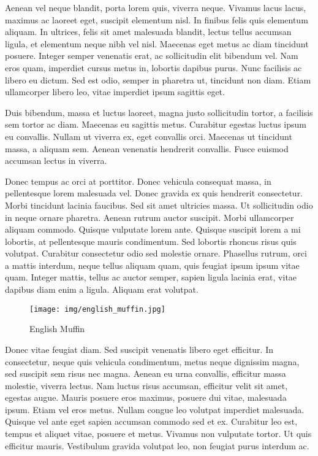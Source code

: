 \documentclass{llncs}
\begin{document}
Aenean vel neque blandit, porta lorem quis, viverra neque. Vivamus lacus lacus, maximus ac laoreet eget, suscipit elementum nisl. In finibus felis quis elementum aliquam. In ultrices, felis sit amet malesuada blandit, lectus tellus accumsan ligula, et elementum neque nibh vel nisl. Maecenas eget metus ac diam tincidunt posuere. Integer semper venenatis erat, ac sollicitudin elit bibendum vel. Nam eros quam, imperdiet cursus metus in, lobortis dapibus purus. Nunc facilisis ac libero eu dictum. Sed est odio, semper in pharetra ut, tincidunt non diam. Etiam ullamcorper libero leo, vitae imperdiet ipsum sagittis eget.

Duis bibendum, massa et luctus laoreet, magna justo sollicitudin tortor, a facilisis sem tortor ac diam. Maecenas eu sagittis metus. Curabitur egestas luctus ipsum eu convallis. Nullam ut viverra ex, eget convallis orci. Maecenas ut tincidunt massa, a aliquam sem. Aenean venenatis hendrerit convallis. Fusce euismod accumsan lectus in viverra.

Donec tempus ac orci at porttitor. Donec vehicula consequat massa, in pellentesque lorem malesuada vel. Donec gravida ex quis hendrerit consectetur. Morbi tincidunt lacinia faucibus. Sed sit amet ultricies massa. Ut sollicitudin odio in neque ornare pharetra. Aenean rutrum auctor suscipit. Morbi ullamcorper aliquam commodo. Quisque vulputate lorem ante. Quisque suscipit lorem a mi lobortis, at pellentesque mauris condimentum. Sed lobortis rhoncus risus quis volutpat. Curabitur consectetur odio sed molestie ornare. Phasellus rutrum, orci a mattis interdum, neque tellus aliquam quam, quis feugiat ipsum ipsum vitae quam. Integer mattis, tellus ac auctor semper, sapien ligula lacinia erat, vitae dapibus diam enim a ligula. Aliquam erat volutpat.

\begin{figure}[h!]
	\begin{center}
	\texttt{[image: img/english\_muffin.jpg]}
	\caption{English Muffin \cite{Muffin:2015}}
	\label{fig:english_muffin}
	\end{center}
\end{figure}

Donec vitae feugiat diam. Sed suscipit venenatis libero eget efficitur. In consectetur, neque quis vehicula condimentum, metus neque dignissim magna, sed suscipit sem risus nec magna. Aenean eu urna convallis, efficitur massa molestie, viverra lectus. Nam luctus risus accumsan, efficitur velit sit amet, egestas augue. Mauris posuere eros maximus, posuere dui vitae, malesuada ipsum. Etiam vel eros metus. Nullam congue leo volutpat imperdiet malesuada. Quisque vel ante eget sapien accumsan commodo sed et ex. Curabitur leo est, tempus et aliquet vitae, posuere et metus. Vivamus non vulputate tortor. Ut quis efficitur mauris. Vestibulum gravida volutpat leo, non feugiat purus interdum ac.
\end{document}
